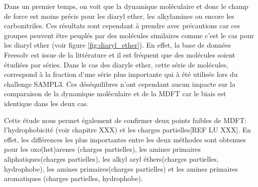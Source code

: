 Dans un premier temps, on voit que la dynamique moléculaire et donc le champ de force est moins précis pour les diaryl ether, les alkylamines ou encore les carbonitriles. Ces résultats sont cependant à prendre avec précautions car ces groupes peuvent être peuplés par des molécules similaires comme c'est le cas pour les diaryl ether (voir figure \ref{fig:diaryl_ether}). En effet, la base de données Freesolv est issue de la littérature et il est fréquent que des molécules soient étudiées par séries. Dans le cas des diaryle ether, cette série de molécules, correspond à la fraction d'une série plus importante qui à été utilisée lors du challenge SAMPL3\cite{Geballe_sampl_2012}. Ces déséquilibres n'ont cependant aucun impacte sur la comparaison de la dynamique moléculaire et de la MDFT car le biais est identique dans les deux cas.

Cette étude nous permet également de confirmer deux points faibles de MDFT: l'hydrophobicité (voir chapitre XXX) et les charges partielles[REF LU XXX]. En effet, les différences les plus importantes entre les deux méthodes sont obtenues pour les oxo(het)arenes (charges partielles), les amines primaires aliphatiques(charges partielles), les alkyl aryl éthers(charges partielles, hydrophobe), les amines primaires(charges partielles) et les amines primaires aromatiques (charges partielles, hydrophobe). 



